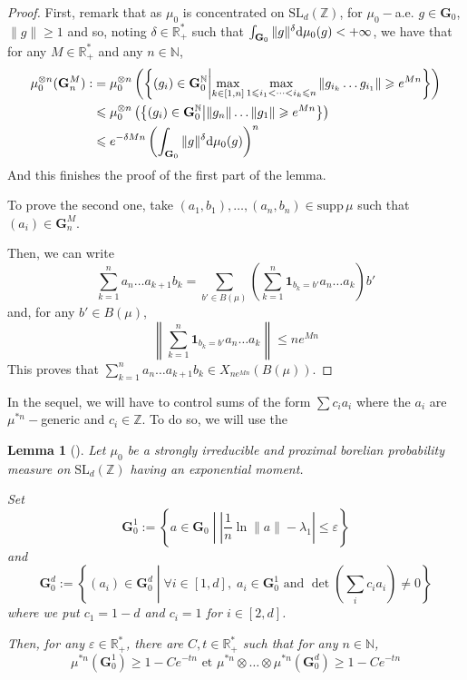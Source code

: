 \documentclass[11pt]{amsart}
\newtheorem{lemma}[theorem]{Lemma}
\theoremstyle{definition}
\theoremstyle{remark}
\numberwithin{equation}{section}
\begin{document}
\begin{proof}
First, remark that as $\mu_0$ is concentrated on $\mathrm{SL}_d({\mathbb Z})$, for $\mu_0-$a.e. $g\in {\mathbf G}_0$, $\|g\|\geqslant 1$ and so, noting $\delta\in {\mathbb R}_+^\ast$ such that $\int_{{\mathbf G}_0} \|g\|^\delta {{\rm d}}\mu_0(g)<+\infty$, we have that for any $M\in {\mathbb R}_+^\ast$ and any $n\in {\mathbb N}$,
\begin{align*}
\mu_0^{\otimes n} ({\mathbf G}_n^M):&=\mu_0^{\otimes n} \left(\left\{ (g_i) \in {\mathbf G}_0^{\mathbb N}\middle| \max_{k\in [1,n]} \max_{1\leqslant i_1<\dots<i_k \leqslant n} \|g_{i_k}\dots g_ {i_1}\| \geqslant e^{Mn}\right\}\right) \\
&  \leqslant \mu_0^{\otimes n}\left( \left\{ (g_i) \in {\mathbf G}_0^{\mathbb N}\middle|  \|g_n\|\dots \|g_1\|\geqslant e^{Mn}\right\}\right) \\
& \leqslant e^{-\delta Mn} \left( \int_{{\mathbf G}_0} \|g\|^\delta {{\rm d}}\mu_0(g)\right)^n
\end{align*}
And this finishes the proof of the first part of the lemma.

To prove the second one, take $(a_1,b_1), \dots ,(a_n,b_n) \in {\mathrm{supp}\,}\mu$ such that $(a_i) \in {\mathbf G}_n^M$.

Then, we can write
\[
\sum_{k=1}^{n} a_n \dots a_{k+1} b_k = \sum_{b'\in B(\mu)} \left(\sum_{k=1}^n {\mathbf{1}}_{b_k=b'} a_n \dots a_k \right)b'
\]
and, for any $b'\in B(\mu)$,
\[
\left\|\sum_{k=1}^n {\mathbf{1}}_{b_k=b'} a_n \dots a_k \right\| \leqslant ne^{Mn}
\]
This proves that $\sum_{k=1}^n a_n \dots a_{k+1} b_k \in X_{ne^{Mn}}(B(\mu))$.
\end{proof}

In the sequel, we will have to control sums of the form $\sum c_i a_i$ where the $a_i$ are $\mu^{\ast n}-$generic and $c_i \in {\mathbb Z}$. To do so, we will use the
\begin{lemma}[\cite{BFLM11}] \label{lemma:BFLM}
Let $\mu_0$ be a strongly irreducible and proximal borelian probability measure on $\mathrm{SL}_d({\mathbb Z})$ having an exponential moment.

Set
\[
{\mathbf G}_0^1 := \left\{ a\in {\mathbf G}_0 \middle|  \left|\frac 1 n \ln \|a\|- \lambda_1\right|\leqslant \varepsilon \right\}
\]
and
\[
{\mathbf G}_0^d := \left\{ (a_i)\in {\mathbf G}_0^d \middle| \forall i\in [1,d],\;a_i\in {\mathbf G}_0^1\text{ and } \det\left(\sum_i c_i a_i\right)\not=0 \right\}
\]
where we put $c_1 = 1-d$ and $c_i=1$ for $i\in [2,d]$.

Then, for any $\varepsilon \in {\mathbb R}_+^\ast$, there are $C,t\in {\mathbb R}_+^\ast$ such that for any $n\in {\mathbb N}$,
\[
\mu^{\ast n}({\mathbf G}_0^1) \geqslant 1-Ce^{-tn}
\text{ et }\mu^{\ast n} \otimes \dots \otimes \mu^{\ast n}({\mathbf G}_0^d) \geqslant  1 - Ce^{-tn}
\]
\end{lemma}
\end{document}
